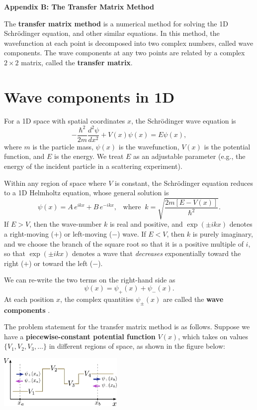 \documentclass[pra,12pt]{revtex4}
\begin{document}
\begin{center}
{\large \textbf{Appendix B: The Transfer Matrix Method}}
\end{center}

The \textbf{transfer matrix method} is a numerical method for solving
the 1D Schr\"odinger equation, and other similar equations.  In this
method, the wavefunction at each point is decomposed into two complex
numbers, called wave components.  The wave components at any two
points are related by a complex $2\times2$ matrix, called the
\textbf{transfer matrix}.

\section{Wave components in 1D}

For a 1D space with spatial coordinates $x$, the Schr\"odinger wave
equation is
$$-\frac{\hbar^2}{2m}\frac{d^2\psi}{dx^2} + V(x) \psi(x) = E\psi(x),$$
where $m$ is the particle mass, $\psi(x)$ is the wavefunction, $V(x)$
is the potential function, and $E$ is the energy.  We treat $E$ as an
adjustable parameter (e.g., the energy of the incident particle in a
scattering experiment).

Within any region of space where $V$ is constant, the Schr\"odinger
equation reduces to a 1D Helmholtz equation, whose general solution is
$$\psi(x) = A\, e^{ik x} + B\, e^{-ik x}, \;\;\; \mathrm{where}\;\; k = \sqrt{\frac{2m[E-V(x)]}{\hbar^2}}.$$
If $E > V$, then the wave-number $k$ is real and positive, and
$\exp(\pm ikx)$ denotes a right-moving ($+$) or left-moving ($-$)
wave.  If $E < V$, then $k$ is purely imaginary, and we choose the
branch of the square root so that it is a positive multiple of $i$, so
that $\exp(\pm ikx)$ denotes a wave that \textit{decreases}
exponentially toward the right ($+$) or toward the left ($-$).

We can re-write the two terms on the right-hand side as
$$\psi(x) = \psi_+(x) + \psi_-(x).$$
At each position $x$, the complex quantities $\psi_\pm(x)$ are called
the \textbf{wave components} .

The problem statement for the transfer matrix method is as follows.
Suppose we have a \textbf{piecewise-constant potential function}
$V(x)$, which takes on values $\{V_1, V_2, V_3, \dots\}$ in different
regions of space, as shown in the figure below:

\begin{center}
  \includegraphics[width=0.45\textwidth]{transfer_matrix_setup}
\end{center}
\end{document}
